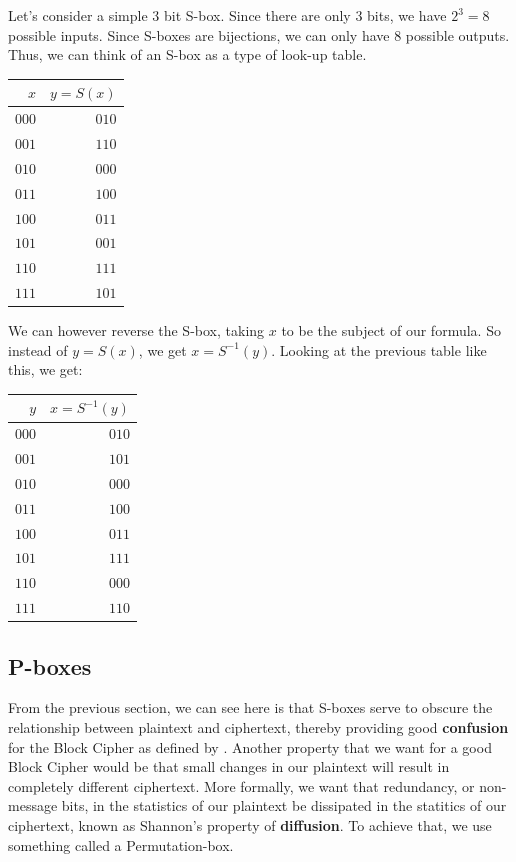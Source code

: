 \begin{example}
Let's consider a simple 3 bit S-box. Since there are only 3 bits, we have 
$2^3 = 8$ possible inputs. Since S-boxes are bijections, we can only have
8 possible outputs. Thus, we can think of an S-box as a type of look-up
table.

\begin{center}
\begin{tabular}{|r|r|}
\hline
$x$ & $y = S(x)$ \\\hline
$000$ & $010$ \\\hline
$001$ & $110$ \\\hline
$010$ & $000$ \\\hline
$011$ & $100$ \\\hline
$100$ & $011$ \\\hline
$101$ & $001$ \\\hline
$110$ & $111$ \\\hline
$111$ & $101$ \\\hline
\end{tabular}
\end{center}

We can however reverse the S-box, taking $x$ to be the subject of our formula.
So instead of $y = S(x)$, we get $x = S^{-1}(y)$. Looking at the previous
table like this, we get:

\begin{center}
\begin{tabular}{|r|r|}
\hline
$y$ & $x = S^{-1}(y)$ \\\hline
$000$ & $010$ \\\hline
$001$ & $101$ \\\hline
$010$ & $000$ \\\hline
$011$ & $100$ \\\hline
$100$ & $011$ \\\hline
$101$ & $111$ \\\hline
$110$ & $000$ \\\hline
$111$ & $110$ \\\hline
\end{tabular}
\end{center}

\end{example}


\subsection{P-boxes}
From the previous section, we can see here is that S-boxes serve to obscure the
relationship between plaintext and ciphertext, thereby providing good
\textbf{confusion} for the Block Cipher as defined by \cite{shannon}. Another
property that we want for a good Block Cipher would be that small changes in
our plaintext will result in completely different ciphertext. More formally, we
want that redundancy, or non-message bits, in the statistics of our plaintext
be dissipated in the statitics of our ciphertext, known as Shannon's property
of \textbf{diffusion}. To achieve that, we use something called a Permutation-box.

